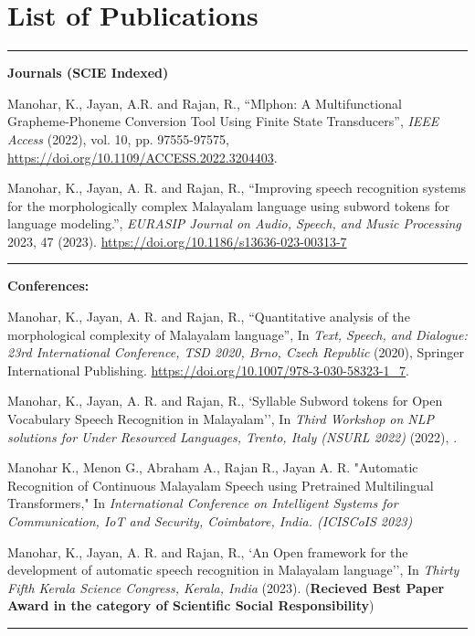 \chapter*{List of Publications} \label{publications}
\noindent\rule{\linewidth}{2pt}
\textbf{{\large Journals (SCIE Indexed)}}
\begin{enumerate}[label=\textbf{[\arabic*]}]

\item Manohar, K., Jayan, A.R. and Rajan, R., ``Mlphon: A Multifunctional Grapheme-Phoneme Conversion Tool Using Finite State Transducers'',
\emph{IEEE Access} (2022), vol. 10, pp. 97555-97575, 
\url{https://doi.org/10.1109/ACCESS.2022.3204403}.


\item Manohar, K., Jayan, A. R. and Rajan, R., ``Improving speech recognition systems for the morphologically complex Malayalam language using subword tokens for language modeling.'',
\emph{EURASIP Journal on Audio, Speech, and Music Processing} 2023, 47 (2023). \url{https://doi.org/10.1186/s13636-023-00313-7}


\end{enumerate}

\noindent\rule{\linewidth}{0.2pt}
\textbf{{\large Conferences:}}
\begin{enumerate}[label=\textbf{[\arabic*]}]

\item Manohar, K., Jayan, A. R. and Rajan, R., ``Quantitative analysis of the morphological complexity of Malayalam language'',
In \emph{ Text, Speech, and Dialogue: 23rd International Conference, TSD 2020, Brno, Czech Republic} (2020), Springer International Publishing.
\url{https://doi.org/10.1007/978-3-030-58323-1_7}.

\item Manohar, K., Jayan, A. R. and Rajan, R., `Syllable Subword tokens for Open Vocabulary Speech Recognition in Malayalam'',
In \emph{Third Workshop on NLP solutions for Under Resourced Languages, Trento, Italy (NSURL 2022)} (2022), \url{}.

\item Manohar K., Menon G., Abraham A., Rajan R., Jayan A. R.  "Automatic Recognition of Continuous Malayalam Speech using Pretrained Multilingual Transformers," In \emph{  International Conference on Intelligent Systems for Communication, IoT and Security, Coimbatore, India. (ICISCoIS 2023)}

\item Manohar, K., Jayan, A. R. and Rajan, R., `An Open framework for the development of automatic speech recognition in Malayalam language'',
In \emph{Thirty Fifth Kerala Science Congress, Kerala, India} (2023). (\textbf{Recieved Best Paper Award in the category of Scientific Social Responsibility})


\end{enumerate}
\noindent\rule{\linewidth}{0.2pt}


